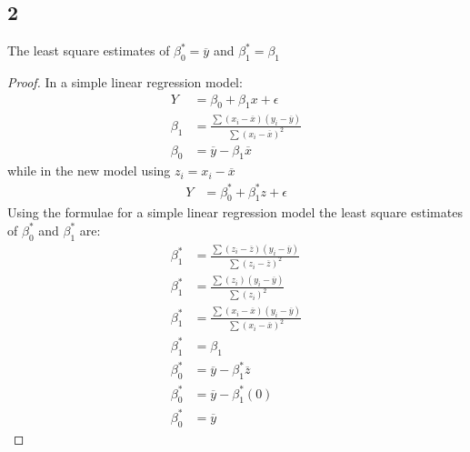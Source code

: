\subsection{2}
\begin{claim}
    The least square estimates of \(\beta_0^* = \overline{y}\) and \(\beta_1^* = \beta_1\)
\end{claim}
\begin{proof}
    In a simple linear regression model:
    \begin{align*}
        Y &= \beta_0 + \beta_1x + \epsilon\\
        \beta_1 &= \frac{\sum(x_i - \overline{x})(y_i-\overline{y})}{\sum(x_i - \overline{x})^2}\\
        \beta_0 &= \overline{y} - \beta_1\overline{x}
    \end{align*}
    while in the new model using \(z_i = x_i - \overline{x}\)
    \begin{align*}
        Y &= \beta_0^* + \beta_1^*z + \epsilon
    \end{align*}
    Using the formulae for a simple linear regression model the least square estimates of \(\beta_0^*\) and \(\beta_1^*\) are:
    \begin{align*}
        \beta_1^* &= \frac{\sum(z_i-\overline{z})(y_i-\overline{y})}{\sum(z_i - \overline{z})^2}\\
        \beta_1^* &= \frac{\sum(z_i)(y_i-\overline{y})}{\sum(z_i)^2}\\
        \beta_1^* &= \frac{\sum(x_i - \overline{x})(y_i-\overline{y})}{\sum(x_i - \overline{x})^2}\\
        \beta_1^* &= \beta_1\\
        \beta_0^* &= \overline{y} - \beta_1^*\overline{z}\\
        \beta_0^* &= \overline{y} - \beta_1^*(0)\\
        \beta_0^* &= \overline{y}
    \end{align*}
\end{proof}

